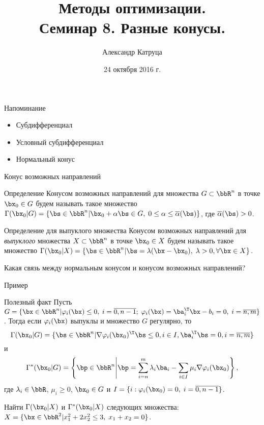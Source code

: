 \documentclass[12pt,russian]{beamer}
\title[Семинар 8]{Методы оптимизации. \\
 Семинар 8. Разные конусы.}
\author{Александр Катруца}
\institute{Московский физико-технический институт,\\
Факультет Управления и Прикладной Математики}
\date{24 октября 2016 г.}
\begin{document}
\begin{frame}
\maketitle
\end{frame}

\begin{frame}{Напоминание}
\begin{itemize}
\item Субдифференциал
\item Условный субдифференциал
\item Нормальный конус
\end{itemize}
\end{frame}

\begin{frame}{Конус возможных направлений}

\begin{block}{Определение}
Конусом возможных направлений для множества $G \subset \bbR^n$ в точке $\bx_0 \in G$ будем называть такое множество $\Gamma(\bx_0 | G) = \{ \bs \in \bbR^n | \bx_0 + \alpha\bs \in G, \; 0 \leq \alpha \leq \overline{\alpha}(\bs) \}$, где $\overline{\alpha}(\bs) > 0$.
\end{block}

\begin{block}{Определение для выпуклого множества}
Конусом возможных направлений для \emph{выпуклого} множества $X \subset \bbR^n$ в точке $\bx_0 \in X$ будем называть такое множество $\Gamma(\bx_0 | X) = \{ \bs \in \bbR^n | \bs = \lambda (\bx - \bx_0), \; \lambda > 0, \forall \bx \in X \}$.
\end{block}
Какая связь между нормальным конусом и конусом возможных направлений?

\end{frame}

\begin{frame}{Пример}
\begin{block}{Полезный факт}
Пусть $G = \{ \bx \in \bbR^n | \varphi_i(\bx) \leq 0, \; i = \overline{0,n-1}; \; \varphi_i(\bx) = \ba_i^{\T}\bx - b_i = 0, \; i = \overline{n, m} \}$. Тогда если $\varphi_i(\bx)$ выпуклы и множество $G$ регулярно, то \vspace{-4mm}
\[
\Gamma(\bx_0|G) = \{ \bs \in \bbR^n | \nabla \varphi_i(\bx_0)^{\T} \bs \leq 0, i \in I, \ba^{\T}_i \bs = 0, i = \overline{n,m} \}
\vspace{-4mm}
\]
и \vspace{-4mm}
\[
\Gamma^*(\bx_0|G) = \left \{ \bp \in \bbR^n \middle| \bp = \sum\limits_{i = n}^m \lambda_i\ba_i - \sum\limits_{i \in I} \mu_i \nabla\varphi_i(\bx_0) \right \},
\vspace{-4mm}
\]
где $\lambda_i \in \bbR$, $\mu_i \geq 0$, $\bx_0 \in G$ и $I = \{i: \varphi_i(\bx_0) = 0, \; i = \overline{0,n-1}\}$.
\end{block}
Найти $\Gamma(\bx_0|X)$ и $\Gamma^*(\bx_0|X)$ следующих множества:
$X = \{ \bx \in \bbR^2 | x^2_1 + 2x^2_2 \leq 3, \; x_1 + x_2 = 0 \}$.
\end{frame}
\end{document}
